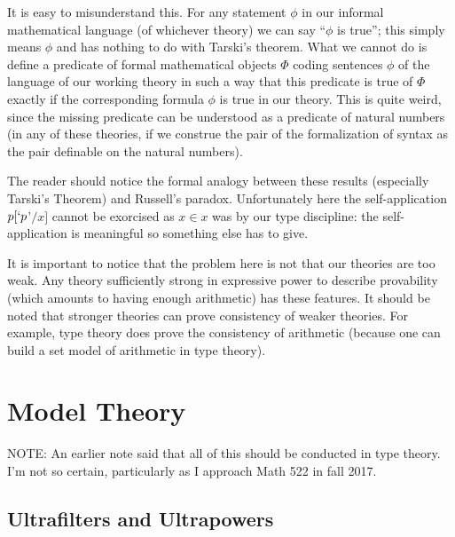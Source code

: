 \documentclass[12pt]{book}
\begin{document}
It is easy to misunderstand this.  For any statement $\phi$ in our
informal mathematical language (of whichever theory) we can say
``$\phi$ is true''; this simply means $\phi$ and has nothing to do
with Tarski's theorem.  What we cannot do is define a predicate of
formal mathematical objects $\Phi$ coding sentences $\phi$ of the
language of our working theory in such a way that this predicate is
true of $\Phi$ exactly if the corresponding formula $\phi$ is true in
our theory.  This is quite weird, since the missing predicate can be
understood as a predicate of natural numbers (in any of these
theories, if we construe the pair of the formalization of syntax as
the pair definable on the natural numbers).

The reader should notice the formal analogy between these results
(especially Tarski's Theorem) and Russell's paradox.  Unfortunately
here the self-application $p[`p$'$/x]$ cannot be exorcised as $x \in x$
was by our type discipline: the self-application is meaningful so
something else has to give.

It is important to notice that the problem here is not that our
theories are too weak.  Any theory sufficiently strong in expressive
power to describe provability (which amounts to having enough
arithmetic) has these features.  It should be noted that stronger
theories can prove consistency of weaker theories.  For example, type
theory does prove the consistency of arithmetic (because one can build
a set model of arithmetic in type theory).

\chapter{Model Theory}

NOTE:  An earlier note said that all of this should be conducted in type theory.  I'm not so certain, particularly as I approach Math 522 in fall 2017.


\section{Ultrafilters and Ultrapowers}
\end{document}
